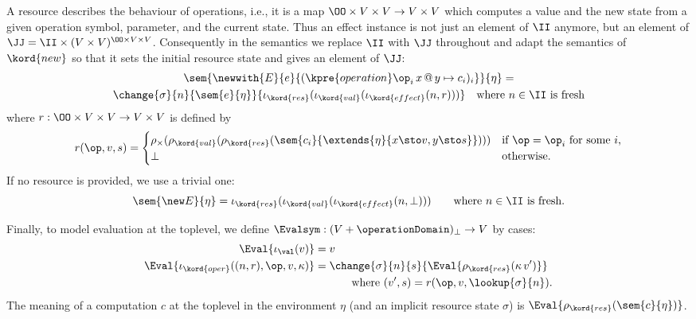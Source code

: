 A resource describes the behaviour of operations, i.e., it is a map $\OO \times V \times V \to V \times V$ which computes a value and the new state from a given operation symbol, parameter, and the current state. Thus an effect instance is not just an element of $\II$ anymore, but an element of $\JJ = \II \times (V \times V)^{\OO \times V \times V}$. Consequently in the semantics we replace $\II$ with $\JJ$ throughout and adapt the semantics of $\kord{new}$ so that it sets the initial resource state and gives an element of $\JJ$:
%
\begin{multline*}
  \sem{\newwith{E}{e}{(\kpre{operation} \op_i \, x \, @ \, y \mapsto c_i)_i}}{\eta} = \\
    \change{\sigma}{n}{\sem{e}{\eta}}
           {\iota_\kord{res}(\iota_\kord{val}(\iota_\kord{effect}(n,r)))}
    \quad \text{where $n \in \II$ is fresh}
\end{multline*}
%
where $r : \OO \times V \times V \to V \times V$ is defined by
%
\begin{equation*}
  r(\op, v, s) =
  \begin{cases}
    \rho_{\times}(\rho_{\kord{val}}(\rho_\kord{res}(\sem{c_i}{\extends{\eta}{x \sto v, y \sto s}}))) &
      \text{if $\op = \op_i$ for some $i$,} \\
    \bot & \text{otherwise.}
  \end{cases}
\end{equation*}
%
If no resource is provided, we use a trivial one:
%
\begin{equation*}
  \sem{\new E}{\eta} =
  \iota_\kord{res}(\iota_\kord{val}(\iota_\kord{effect}(n, \bot)))
  \quad \quad \text{where $n \in \II$ is fresh.}
\end{equation*}

Finally, to model evaluation at the toplevel, we define $\Evalsym : (V + \operationDomain)_\bot \to V$ by cases:
%
\begin{align*}
  \Eval{\iota_{\val}(v)} &= v \\
  \Eval{\iota_{\kord{oper}}((n, r), \op, v, \kappa)} &=
  \begin{aligned}[t]
  &\change{\sigma}{n}{s}{\Eval{\rho_\kord{res}(\kappa \, v')}} \\
  &\qquad \text{where $(v', s) = r(\op, v, \lookup{\sigma}{n})$}.
  \end{aligned}
\end{align*}
%
The meaning of a computation $c$ at the toplevel in the environment $\eta$ (and an
implicit resource state $\sigma$) is $\Eval{\rho_\kord{res}(\sem{c}{\eta})}$.


